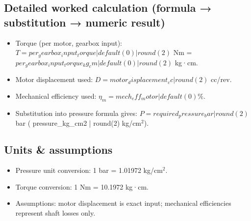 \documentclass[14pt]{article}
\begin{document}
\subsection*{Detailed worked calculation (formula → substitution → numeric result)}
\begin{itemize}
  \item Torque (per motor, gearbox input): $T = {{ per_gearbox_input_torque | default(0) | round(2) }}$ Nm = ${{ per_gearbox_input_torque_kg_cm | default(0) | round(2) }}$ kg·cm.
  \item Motor displacement used: $D = {{ motor_displacement_cc | round(2) }}$ cc/rev.
  \item Mechanical efficiency used: $\eta_m = {{ mech_eff_motor | default(0) }}\%$.
  \item Substitution into pressure formula gives: $P = {{ required_pressure_bar | round(2) }}$ bar ({{ pressure_kg_cm2 | round(2) }} kg/cm$^2$).
\end{itemize}

\subsection*{Units & assumptions}
\begin{itemize}
  \item Pressure unit conversion: 1 bar = 1.01972 kg/cm$^2$.
  \item Torque conversion: 1 Nm = 10.1972 kg·cm.
  \item Assumptions: motor displacement is exact input; mechanical efficiencies represent shaft losses only.
\end{itemize}
\end{document}
